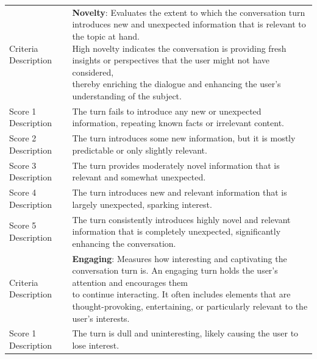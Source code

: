 \begin{tabular}{ll} 
\toprule
Criteria Description & \textbf{Novelty}: \makecell[l]{Evaluates the extent to which the conversation turn introduces new and unexpected information that is relevant to the topic at hand. \\ High novelty indicates the conversation is providing fresh insights or perspectives that the user might not have considered, \\ thereby enriching the dialogue and enhancing the user's understanding of the subject.}                                                                                                              \\
Score 1 Description  & The turn fails to introduce any new or unexpected information, repeating known facts or irrelevant content.                                                                                                                        \\
Score 2 Description  & The turn introduces some new information, but it is mostly predictable or only slightly relevant.                                                                                                                              \\
Score 3 Description  & The turn provides moderately novel information that is relevant and somewhat unexpected.                                                                                          \\
Score 4 Description  & The turn introduces new and relevant information that is largely unexpected, sparking interest.                                                                \\
Score 5 Description  & The turn consistently introduces highly novel and relevant information that is completely unexpected, significantly enhancing the conversation.                                                                               \\ 
\midrule
Criteria Description & \textbf{Engaging}: \makecell[l]{Measures how interesting and captivating the conversation turn is. An engaging turn holds the user's attention and encourages them \\ to continue interacting. It often includes elements that are thought-provoking, entertaining, or particularly relevant to the user's interests. }                                                                                                      \\
Score 1 Description  & The turn is dull and uninteresting, likely causing the user to lose interest.                                                                                                                                     \\

\end{tabular}
